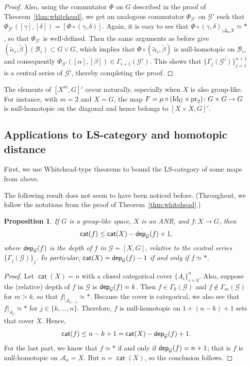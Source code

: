 \documentclass[amscd,amssymb,verbatim,10pt]{amsart}
\numberwithin{equation}{section}
\theoremstyle{plain}
\newtheorem{proposition}[theorem]{Proposition}
\theoremstyle{definition}
\DeclareMathOperator{\cat}{{\mathsf{cat}}}
\def\id{\protect\operatorname{Id}}
\def\pr{\protect\operatorname{pr}}
\newcommand{\cA}{{\mathcal{A}}}
\newcommand{\cB}{{\mathcal{B}}}
\newcommand{\cG}{{\mathcal{G}}}
\newcommand{\dep}{{\sf {dep}}}
\def\wt{\widetilde}
\begin{document}
\begin{proof}
Also, using the commutator $\Phi$ on $G$ described in the proof of Theorem~\ref{thm:whitehead}, we get an analogous commutator $\Phi_{\cG'}$ on $\cG'$ such that $\Phi_{\cG'}([\gamma],[\delta]) = [\Phi \circ (\gamma,\delta)]$. Again, it is easy to see that $\Phi \circ (\gamma,\delta)_{|\Delta_mX}\simeq\ast$, so that $\Phi_{\cG'}$ is well-defined. Then the same arguments as before give $(\wt\alpha_i,\wt\beta)(\cB_i)\subset G\vee G$, which implies that $\Phi \circ (\wt \alpha_i, \wt \beta)$ is null-homotopic on $\cB_i$, and consequently $\Phi_{\cG'}([\alpha],[\beta])\in\Gamma_{i+1}(\cG')$. This shows that $\{\Gamma_j(\cG')\}_{j=1}^{n+1}$ is a central series of $\cG'$, thereby completing the proof.
\end{proof}

The elements of $[X^m,G]'$ occur naturally, especially when $X$ is also group-like. For instance, with $m=2$ and $X=G$, the map $F=\mu\circ(\id_G\times\pr_2)\colon G\times G\to G$ is null-homotopic on the diagonal and hence belongs to $[X\times X,G]'$.

\subsection{Applications to LS-category and homotopic distance}\label{subsec: applications}
First, we use Whitehead-type theorems to bound the LS-category of some maps from above.

The following result does not seem to have been noticed before. (Throughout, we follow the notations from the proof of Theorem~\ref{thm:whitehead}.)

\begin{proposition}\label{prop:catfbound}
If $G$ is a group-like space, $X$ is an ANR, and $f\colon X\to G$, then 
$$\cat(f) \leq \cat(X) - \dep_{\cG}(f) +1,$$
where $\dep_{\cG}(f)$ is the depth of $f$ in $\cG=[X,G]$, relative to the central series $\{\Gamma_j(\cG)\}_j$. In particular,
$\cat(X)=\dep_{\cG}(f)-1$ if and only if $f \simeq *$.
\end{proposition}
\begin{proof}
Let $\cat(X)=n$ with a closed categorical cover $\{A_i\}_{i=0}^{n}$. 
Also, suppose the (relative) depth of $f$ in $\cG$ is $\dep_{\cG}(f)=k$. Then $f\in \Gamma_k(\cG)$
and $f \not\in \Gamma_m(\cG)$ for $m > k$, so that $f|_{\cA_{k-1}}
\simeq *$. Because the cover is categorical, we also see that $f|_{A_j}
\simeq *$ for $j\in\{ k, \ldots, n\}$. Therefore, $f$ is null-homotopic on $1 + (n-k)+1$ sets that cover $X$. Hence,
$$
\cat(f) \leq n-k+1 = \cat(X) - \dep_{\cG}(f) + 1.
$$
For the last part, we know that $f \simeq *$ if and only if $\dep_{\cG}(f)=n+1$; that is
$f$ is null-homotopic on $\cA_n = X$. But $n=\cat(X)$, so the conclusion follows.
\end{proof}
\end{document}
